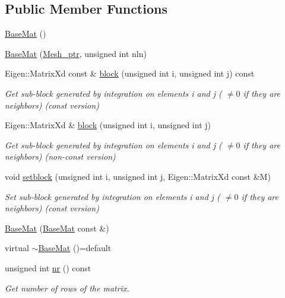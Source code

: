 \subsection*{Public Member Functions}
\begin{DoxyCompactItemize}
\item 
\hyperlink{classTspeed_1_1BaseMat_a0bc33a9288577b32639974d28e686026}{Base\-Mat} ()
\item 
\hyperlink{classTspeed_1_1BaseMat_a23de2c55f78003dbadae51a3c495b9e9}{Base\-Mat} (\hyperlink{namespaceTspeed_a7367a01365c4cc2c1a09305b3effc4e8}{Mesh\-\_\-ptr}, unsigned int nln)
\item 
Eigen\-::\-Matrix\-Xd const \& \hyperlink{classTspeed_1_1BaseMat_a9abd329c5642cb0733dc9bae2bc27c40}{block} (unsigned int i, unsigned int j) const 
\begin{DoxyCompactList}\small\item\em Get sub-\/block generated by integration on elements i and j ( $ \neq 0 $ if they are neighbors) (const version) \end{DoxyCompactList}\item 
Eigen\-::\-Matrix\-Xd \& \hyperlink{classTspeed_1_1BaseMat_aee18568676b6ec413ef58292278b88b1}{block} (unsigned int i, unsigned int j)
\begin{DoxyCompactList}\small\item\em Get sub-\/block generated by integration on elements i and j ( $ \neq 0 $ if they are neighbors) (non-\/const version) \end{DoxyCompactList}\item 
void \hyperlink{classTspeed_1_1BaseMat_af8995143af50b0c6296ba6565238722a}{setblock} (unsigned int i, unsigned int j, Eigen\-::\-Matrix\-Xd const \&M)
\begin{DoxyCompactList}\small\item\em Set sub-\/block generated by integration on elements i and j ( $ \neq 0 $ if they are neighbors) (const version) \end{DoxyCompactList}\item 
\hyperlink{classTspeed_1_1BaseMat_aac366647d4c8c12ffca8ab1c8fb8881a}{Base\-Mat} (\hyperlink{classTspeed_1_1BaseMat}{Base\-Mat} const \&)
\item 
virtual \hyperlink{classTspeed_1_1BaseMat_a0aa68786e0a52c9f1fe6838813a299ce}{$\sim$\-Base\-Mat} ()=default
\item 
unsigned int \hyperlink{classTspeed_1_1BaseMat_a484dafa1e629d9774c8a402945a2c132}{nr} () const 
\begin{DoxyCompactList}\small\item\em Get number of rows of the matrix. \end{DoxyCompactList}\item 

\end{DoxyCompactItemize}
